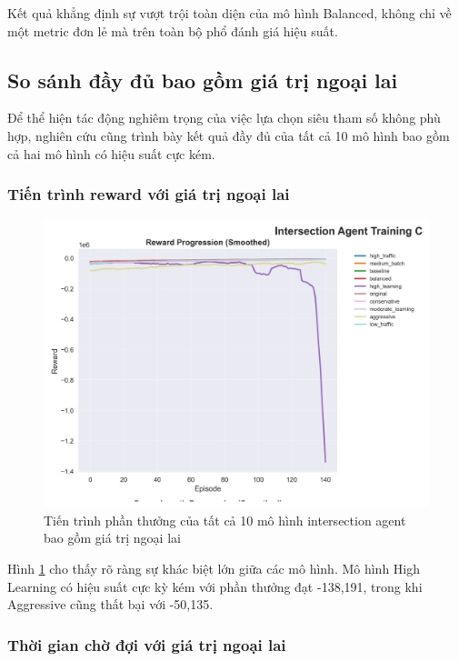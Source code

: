 Kết quả khẳng định sự vượt trội toàn diện của mô hình Balanced, không chỉ về một metric đơn lẻ mà trên toàn bộ phổ đánh giá hiệu suất.

\subsection{So sánh đầy đủ bao gồm giá trị ngoại lai}

Để thể hiện tác động nghiêm trọng của việc lựa chọn siêu tham số không phù hợp,
nghiên cứu cũng trình bày kết quả đầy đủ của tất cả 10 mô hình bao gồm cả hai mô
hình có hiệu suất cực kém.

\subsubsection{Tiến trình reward với giá trị ngoại lai}

\begin{figure}[!htp]
    \centering
    \includegraphics[width=\textwidth]{
        figures/individual_plots/intersection_full_reward_progress.png
    }
    \caption{Tiến trình phần thưởng của tất cả 10 mô hình intersection agent bao gồm giá trị ngoại lai}
    \label{fig:intersection_full_reward_progress}
\end{figure}

Hình \ref{fig:intersection_full_reward_progress} cho thấy rõ ràng sự khác biệt lớn
giữa các mô hình. Mô hình High Learning có hiệu suất cực kỳ kém với phần thưởng đạt -138,191,
trong khi Aggressive cũng thất bại với -50,135.

\subsubsection{Thời gian chờ đợi với giá trị ngoại lai}

